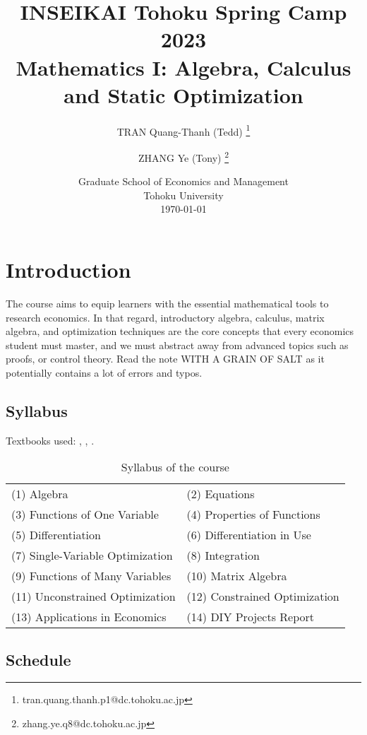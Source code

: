 \documentclass[10pt,a4paper]{book}
\author{%
	TRAN Quang-Thanh (Tedd) \thanks{tran.quang.thanh.p1@dc.tohoku.ac.jp}
	
	\and ZHANG Ye (Tony)  \thanks{zhang.ye.q8@dc.tohoku.ac.jp} 
		}
\title{INSEIKAI Tohoku Spring Camp 2023 \\ \textbf{Mathematics I: Algebra, Calculus and Static Optimization}}
\date{Graduate School of Economics and Management \\Tohoku University \\[\baselineskip] \today}
\theoremstyle{definition}\newtheorem{definition}{Definition}
\theoremstyle{definition}\newtheorem{fact}{Fact}
\theoremstyle{definition}\newtheorem{ex}{Ex.}
\theoremstyle{definition}\newtheorem{project}{Project}
\theoremstyle{definition}\newtheorem{problem}{Problem}
\theoremstyle{definition}\newtheorem{example}{Example}
\numberwithin{theorem}{chapter}
\numberwithin{corollary}{chapter}
\numberwithin{assumption}{chapter}
\numberwithin{definition}{chapter}
\numberwithin{prop}{chapter}
\numberwithin{notation}{chapter}
\numberwithin{problem}{chapter}
\numberwithin{example}{chapter}
\numberwithin{fact}{chapter}
\numberwithin{ex}{chapter}
\begin{document}
	\maketitle
	\setcounter{tocdepth}{2}
	\tableofcontents
	\newpage
	
	\section{Introduction}
	The course aims to equip learners with the essential mathematical tools to research economics. In that regard, introductory algebra, calculus, matrix algebra, and optimization techniques are the core concepts that every economics student must master, and we must abstract away from advanced topics such as proofs, or control theory. Read the note WITH A GRAIN OF SALT as it potentially contains a lot of errors and typos.
		
	\subsection*{Syllabus}
	Textbooks used: \textcite{simon1994mathematics}, \textcite{sydsaeter2008essential}, \textcite{sydsaeter2008further}.
	
	\begin{table}[ht]
		\centering
		\begin{tabular}{ l  l}
			\hline 
			(1) Algebra                      & (2) Equations                 \\
			(3) Functions of One Variable    & (4) Properties of Functions   \\
			(5) Differentiation              & (6) Differentiation in Use    \\
			(7) Single-Variable Optimization & (8) Integration               \\
			(9) Functions of Many Variables  & (10) Matrix Algebra           \\
			(11) Unconstrained Optimization  & (12) Constrained Optimization \\
			(13) Applications in Economics   & (14) DIY Projects Report      
		\end{tabular}
		\caption{Syllabus of the course}
	\end{table}
	
	\subsection*{Schedule}
	
\end{document}
